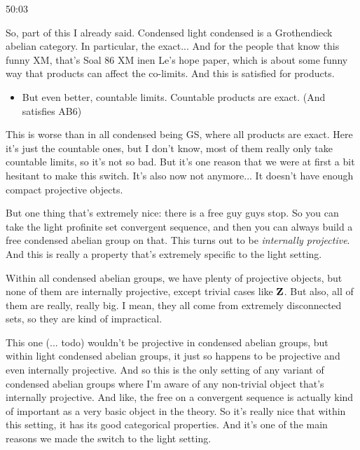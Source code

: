 \begin{example}
\begin{unfinished}{50:03}
\begin{remark}
\begin{example}
\end{example}

So, part of this I already said. Condensed light condensed is a Grothendieck abelian category. In particular, the  exact...   And for the people that know this funny XM, that's Soal 86 XM inen Le's hope paper, which is about some funny way that products can affect the co-limits. And this is satisfied for products.

\begin{itemize}
\item But even better, countable limits. Countable products are exact. (And satisfies AB6)

\end{itemize}

This is worse than in all condensed being GS, where all products are exact. Here it's just the countable ones, but I don't know, most of them really only take countable limits, so it's not so bad. But it's one reason that we were at first a bit hesitant to make this switch. It's also now not anymore... It doesn't have enough compact projective objects.

But one thing that's extremely nice: there is a free guy guys stop. So you can take the light profinite set convergent sequence, and then you can always build a free condensed abelian group on that. This turns out to be \emph{internally projective}. And this is really a property that's extremely specific to the light setting.

Within all condensed abelian groups, we have plenty of projective objects, but none of them are internally projective, except trivial cases like $\mathbf Z$. But also, all of them are really, really big. I mean, they all come from extremely disconnected sets, so they are kind of impractical.

This one (\Z ... todo) wouldn't be projective in condensed abelian groups, but within light condensed abelian groups, it just so happens to be projective and even internally projective. And so this is the only setting of any variant of condensed abelian groups where I'm aware of any non-trivial object that's internally projective. And like, the free  on a convergent sequence is actually kind of important as a very basic object in the theory. So it's really nice that within this setting, it has its good categorical properties. And it's one of the main reasons we made the switch to the light setting.


\end{remark}
\end{unfinished}
\end{example}
